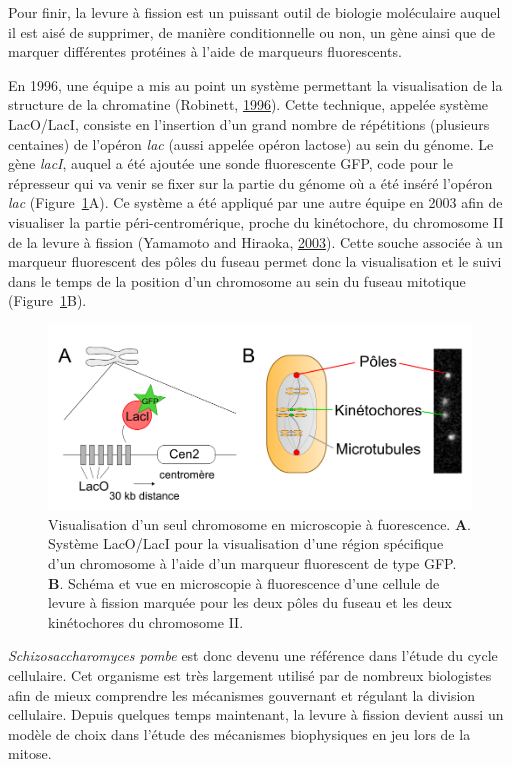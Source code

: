 \documentclass[12pt,a4paper,twoside,openright]{book}
\begin{document}
Pour finir, la levure à fission est un puissant outil de biologie
moléculaire auquel il est aisé de supprimer, de manière conditionnelle
ou non, un gène ainsi que de marquer différentes protéines à l'aide de
marqueurs fluorescents.

En 1996, une équipe a mis au point un système permettant la
visualisation de la structure de la chromatine (Robinett,
\protect\hyperlink{ref-Robinett1996}{1996}). Cette technique, appelée
système LacO/LacI, consiste en l'insertion d'un grand nombre de
répétitions (plusieurs centaines) de l'opéron \emph{lac} (aussi appelée
opéron lactose) au sein du génome. Le gène \emph{lacI}, auquel a été
ajoutée une sonde fluorescente GFP, code pour le répresseur qui va venir
se fixer sur la partie du génome où a été inséré l'opéron \emph{lac}
(Figure~\ref{fig:lac}A). Ce système a été appliqué par une autre équipe
en 2003 afin de visualiser la partie péri-centromérique, proche du
kinétochore, du chromosome II de la levure à fission (Yamamoto and
Hiraoka, \protect\hyperlink{ref-Yamamoto2003}{2003}). Cette souche
associée à un marqueur fluorescent des pôles du fuseau permet donc la
visualisation et le suivi dans le temps de la position d'un chromosome
au sein du fuseau mitotique (Figure~\ref{fig:lac}B).

\begin{figure}[htbp]
\centering
\includegraphics{figures/intro/lac.png}
\caption[Visualisation d'un seul chromosome en microscopie à fuorescence]{\label{fig:lac}Visualisation
d'un seul chromosome en microscopie à fuorescence. \textbf{A}. Système
LacO/LacI pour la visualisation d'une région spécifique d'un chromosome
à l'aide d'un marqueur fluorescent de type GFP. \textbf{B}. Schéma et
vue en microscopie à fluorescence d'une cellule de levure à fission
marquée pour les deux pôles du fuseau et les deux kinétochores du
chromosome II.}
\end{figure}

\emph{Schizosaccharomyces pombe} est donc devenu une référence dans
l'étude du cycle cellulaire. Cet organisme est très largement utilisé
par de nombreux biologistes afin de mieux comprendre les mécanismes
gouvernant et régulant la division cellulaire. Depuis quelques temps
maintenant, la levure à fission devient aussi un modèle de choix dans
l'étude des mécanismes biophysiques en jeu lors de la mitose.
\end{document}
